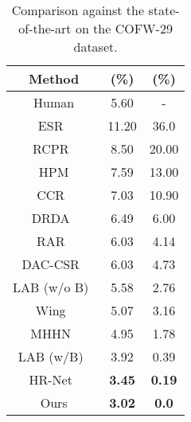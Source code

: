 \documentclass{bmvc2k}
\newcommand{\best}[1]{\color{red}\textbf{#1}}
\newcommand{\secondb}[1]{\color{blue}\textbf{#1}}
\begin{document}
\begin{table}[!htbp]
	\caption{Comparison against the state-of-the-art on the COFW-29 dataset.}\label{tab:sota_cofw29}
	\centering
		\begin{tabular}{ccc}
			\toprule
			Method & (\%) &   (\%) \\
			\midrule
            Human & 5.60 & - \\
            ESR~\cite{cao2014face} & 11.20 & 36.0 \\
            RCPR~\cite{burgos2013robust} & 8.50 & 20.00 \\
            HPM & 7.59 & 13.00 \\
            CCR~\cite{feng2014random} & 7.03 & 10.90 \\
            DRDA~\cite{zhang2016occlusion} & 6.49 & 6.00 \\
            RAR~\cite{xiao2016robust} & 6.03 & 4.14 \\
            DAC-CSR~\cite{feng2017dynamic} & 6.03 & 4.73 \\
            LAB (w/o B)~\cite{wu2018look} & 5.58 & 2.76 \\
            Wing~\cite{feng2018wing} & 5.07 & 3.16 \\
            MHHN~\cite{wan2020robust} & 4.95 & 1.78 \\
            LAB  (w/B)~\cite{wu2018look} & 3.92 & 0.39 \\
            HR-Net~\cite{sun2019high} & \secondb{3.45} & \secondb{0.19} \\
            Ours & \best{3.02} & \best{0.0} \\ 
			\bottomrule
		\end{tabular}
\end{table}
\end{document}
